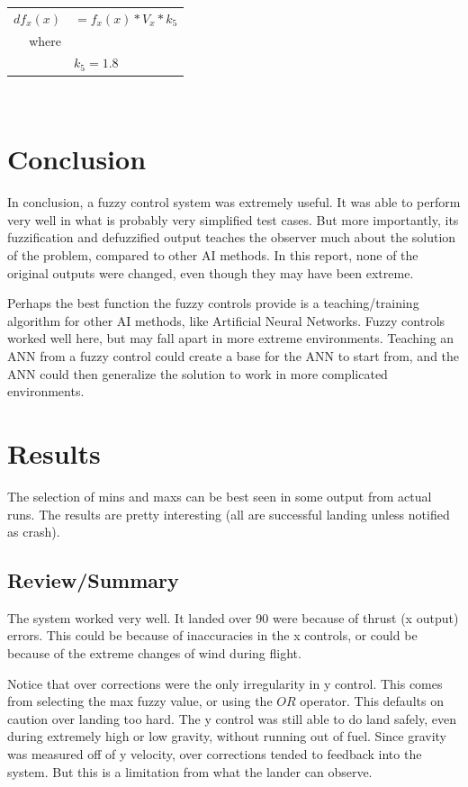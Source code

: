 \documentclass[12pt]{article}
\begin{document}
\begin{tabular}{r l}
	$df_{x}(x)$		&	$ = f_{x}(x) * V_x  * k_5$ \\
	where		& \\
				&	$k_5 = 1.8$
\end{tabular} \\

\pagebreak


\section{Conclusion}
In conclusion, a fuzzy control system was extremely useful. It was able to perform very well in what is 
probably very simplified test cases. But more importantly, its fuzzification and defuzzified output teaches 
the observer much about the solution of the problem, compared to other AI methods. In this report, none of
the original outputs were changed, even though they may have been extreme.

Perhaps the best function the fuzzy controls provide is a teaching/training algorithm for other AI methods,
like Artificial Neural Networks. Fuzzy controls worked well here, but may fall apart in more extreme 
environments. Teaching an ANN from a fuzzy control could create a base for the ANN to start from,
and the ANN could then generalize the solution to work in more complicated environments.


\section{Results}
The selection of mins and maxs can be best seen in some output from actual runs. The results are pretty 
interesting (all are successful landing unless notified as crash).

\subsection{Review/Summary}
The system worked very well. It landed over 90%
were because of thrust (x output) errors. This could be because of inaccuracies in the x controls, or could
be because of the extreme changes of wind during flight. 

Notice that over corrections were the only irregularity in y control. This comes from selecting the max 
fuzzy value, or using the $OR$ operator. This defaults on caution over landing too hard. The y control was
still able to do land safely, even during extremely high or low gravity, without running out of fuel. Since 
gravity was measured off of y velocity, over corrections tended to feedback into the system. But this is a 
limitation from what the lander can observe.
\end{document}
